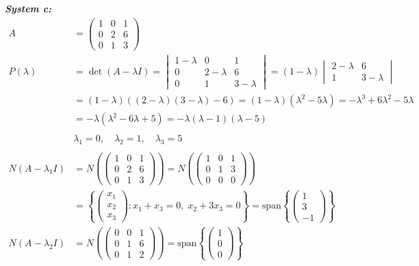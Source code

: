 \documentclass{article}
\begin{document}
\vspace{0.2cm}\noindent\textbf{\textit{System c:}}
\begin{align*}
    A &= \begin{pmatrix} 1 & 0 & 1 \\ 0 & 2 & 6 \\ 0 & 1 & 3 \end{pmatrix} \\
    P(\lambda) &= \det(A - \lambda I) = \begin{vmatrix} 1 - \lambda & 0 & 1 \\ 0 & 2 - \lambda & 6 \\ 0 & 1 & 3 - \lambda \end{vmatrix}
    = (1 - \lambda) \begin{vmatrix} 2 - \lambda & 6 \\ 1 & 3 - \lambda \end{vmatrix} \\
    &= (1 - \lambda)((2 - \lambda)(3 - \lambda) - 6) = (1 - \lambda)(\lambda^2 - 5\lambda) = -\lambda^3 + 6\lambda^2 - 5\lambda \\
    &= -\lambda(\lambda^2 - 6\lambda + 5) = -\lambda(\lambda - 1)(\lambda - 5) \\
    \\
    &\lambda_1 = 0, \quad \lambda_2 = 1, \quad \lambda_3 = 5 \\
    \\
    N(A - \lambda_1 I) &= N\left(\begin{pmatrix} 1 & 0 & 1 \\ 0 & 2 & 6 \\ 0 & 1 & 3 \end{pmatrix}\right) = N\left(\begin{pmatrix} 1 & 0 & 1 \\ 0 & 1 & 3 \\ 0 & 0 & 0 \end{pmatrix}\right) \\
    &= \left\{ \begin{pmatrix} x_1 \\ x_2 \\ x_3 \end{pmatrix} : x_1 + x_3 = 0, \; x_2 + 3x_3 = 0 \right\}
    = \text{span}\left\{ \begin{pmatrix} 1 \\ 3 \\ -1 \end{pmatrix} \right\} \\
    N(A - \lambda_2 I) &= N\left(\begin{pmatrix} 0 & 0 & 1 \\ 0 & 1 & 6 \\ 0 & 1 & 2 \end{pmatrix}\right) = \text{span}\left\{ \begin{pmatrix} 1 \\ 0 \\ 0 \end{pmatrix} \right\} \\

\end{align*}
\end{document}
